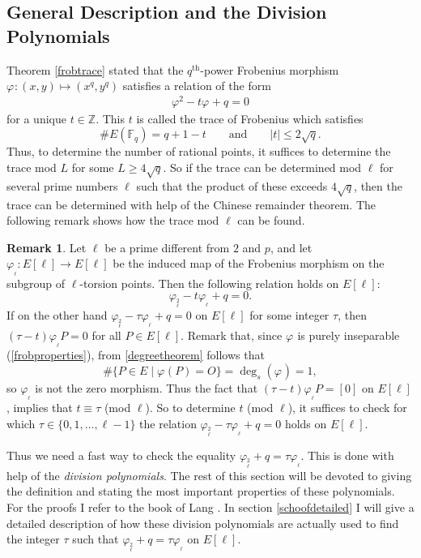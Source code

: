 \documentclass{article}
\numberwithin{equation}{section}
\theoremstyle{definition}
\newtheorem{remark}[theorem]{Remark}
\newcommand{\ZZ}{{\mathbb Z}} %
\newcommand{\FF}[1]{{\mathbb F}_{#1}} %
\newcommand{\frob}[1][]{\varphi_{#1}} %
\newcommand{\sdegree}[1]{\operatorname{deg}_s \left(#1\right)} %
\begin{document}
\subsection{General Description and the Division Polynomials}\label{divpolsection}
Theorem \ref{frobtrace} stated that the $q^\text{th}$-power Frobenius morphism $\frob:(x,y) \mapsto (x^q,y^q)$ satisfies a relation of the form $$\frob^2-t\frob+q=0$$ for a unique $t \in \ZZ$. This $t$ is called the trace of Frobenius which satisfies $$\#E(\FF{q})=q+1-t \qquad \text{and} \qquad |t| \leq 2\sqrt{q}.$$ Thus, to determine the number of rational points, it suffices to determine the trace mod $L$ for some $L \geq 4 \sqrt{q}$. So if the trace can be determined mod $\ell$ for several prime numbers $\ell$ such that the product of these exceeds $4\sqrt{q}$, then the trace can be determined with help of the Chinese remainder theorem. The following remark shows how the trace mod $\ell$ can be found.

\begin{remark}
Let $\ell$ be a prime different from $2$ and $p$, and let $\frob_\ell:E[\ell] \rightarrow E[\ell]$ be the induced map of the Frobenius morphism on the subgroup of $\ell$-torsion points. Then the following relation holds on $E[\ell]$: $$\frob_\ell^2-t\frob_\ell +q=0.$$ If on the other hand $\frob_\ell^2 - \tau \frob_\ell +q = 0$ on $E[\ell]$ for some integer $\tau$, then $(\tau - t)\frob_\ell P = 0$ for all $P \in E[\ell]$. Remark that, since $\frob$ is purely inseparable (\ref{frobproperties}), from \ref{degreetheorem} follows that $$\#\{P \in E \; | \; \frob(P)=O\} = \sdegree{\frob}=1,$$ so $\frob_\ell$ is not the zero morphism. Thus the fact that $(\tau-t)\frob_\ell P = [0]$ on $E[\ell]$, implies that $t \equiv \tau$ (mod $\ell$). So to determine $ t$ (mod $\ell$), it suffices to check for which $\tau \in \{0,1,\ldots,\ell-1\}$ the relation $\frob_\ell^2 -\tau\frob_\ell +q=0$ holds on $E[\ell]$.
\end{remark}


Thus we need a fast way to check the equality $\frob_\ell^2+q=\tau\frob_\ell$. This is done with help of the \emph{division polynomials}. The rest of this section will be devoted to giving the definition and stating the most important properties of these polynomials. For the proofs I refer to the book of Lang \cite{Lang}. In section \ref{schoofdetailed} I will give a detailed description of how these division polynomials are actually used to find the integer $\tau$ such that $\frob_\ell^2+q=\tau\frob_\ell$ on $E[\ell]$.
\end{document}
